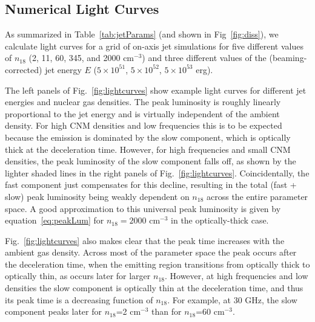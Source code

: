 \documentclass[usenatbib,fleqn]{mnras}
\begin{document}
\subsection{Numerical Light Curves}
\label{sec:numResults}
As summarized in Table~\ref{tab:jetParams} (and shown in
Fig~\ref{fig:diss}), we calculate light curves for a grid of on-axis
jet simulations for five different values of $n_{18}$ (2, 11, 60, 345,
and 2000 cm$^{-3}$) and three different values of the
(beaming-corrected) jet energy $E$ ($5\times 10^{51}$, $5\times
10^{52}$, $5\times 10^{53}$ erg).

The left panels of Fig.~\ref{fig:lightcurves} show example light
curves for different jet energies and nuclear gas densities. The peak
luminosity is roughly linearly proportional to the jet energy and is
virtually independent of the ambient density.  For high CNM densities
and low frequencies this is to be expected because the emission is
dominated by the slow component, which is optically thick at the
deceleration time. However, for high frequencies and small CNM
densities, the peak luminosity of the slow component falls off, as
shown by the lighter shaded lines in the right panels of
Fig.~\ref{fig:lightcurves}. Coincidentally, the fast component just
compensates for this decline, resulting in the total (fast + slow)
peak luminosity being weakly dependent on $n_{18}$ across the entire
parameter space.  A good approximation to this universal peak
luminosity is given by equation~\ref{eq:peakLum} for $n_{18}=2000$
cm$^{-3}$ in the optically-thick case.


Fig.~\ref{fig:lightcurves} also makes clear that the peak time
increases with the ambient gas density.  Across most of the parameter
space the peak occurs after the deceleration time, when the emitting
region transitions from optically thick to optically thin, as occurs
later for larger $n_{18}$. However, at high frequencies and low
densities the slow component is optically thin at the deceleration
time, and thus its peak time is a decreasing function of $n_{18}$. For
example, at 30 GHz, the slow component peaks later for $n_{18}$=2
cm$^{-3}$ than for $n_{18}$=60 cm$^{-3}$.
\end{document}

